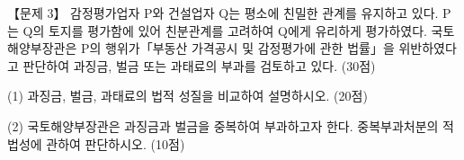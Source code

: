 \begin{longquestion}{【문제 3】}
감정평가업자 P와 건설업자 Q는 평소에 친밀한 관계를 유지하고 있다. P는 Q의 토지를 평가함에 있어 친분관계를 고려하여 Q에게 유리하게 평가하였다. 국토해양부장관은 P의 행위가「부동산 가격공시 및 감정평가에 관한 법률」을 위반하였다고 판단하여 과징금, 벌금 또는 과태료의 부과를 검토하고 있다. (30점) \par
\medskip\noindent (1) 과징금, 벌금, 과태료의 법적 성질을 비교하여 설명하시오. (20점) \par
\medskip\noindent (2) 국토해양부장관은 과징금과 벌금을 중복하여 부과하고자 한다. 중복부과처분의 적법성에 관하여 판단하시오. (10점) \par
\end{longquestion}
